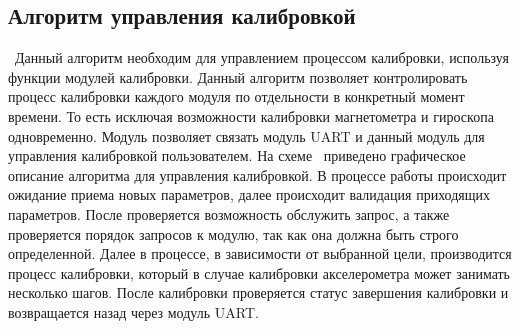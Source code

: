 
\subsection{Алгоритм управления калибровкой}
\blockScheme\
Данный алгоритм необходим для управлением процессом калибровки, используя функции модулей калибровки. 
Данный алгоритм позволяет контролировать
процесс калибровки каждого модуля по отдельности в конкретный момент времени. 
То есть исключая возможности калибровки магнетометра и гироскопа
одновременно. 
Модуль позволяет связать модуль UART и данный модуль для управления калибровкой пользователем.
На схеме \blockScheme\ приведено графическое описание алгоритма для управления калибровкой. В процессе работы происходит 
ожидание приема новых параметров, далее происходит валидация
приходящих параметров. После проверяется возможность обслужить запрос, а также проверяется порядок запросов к модулю, так как она должна быть строго определенной.
Далее в процессе, в зависимости от выбранной цели, производится процесс калибровки, который в случае калибровки акселерометра может занимать несколько шагов.
После калибровки проверяется статус завершения калибровки и возвращается назад через модуль UART.

